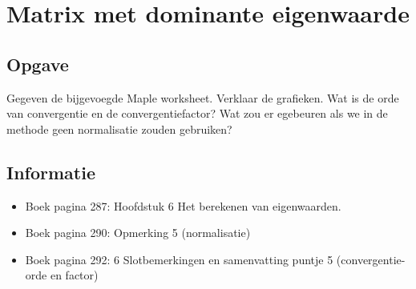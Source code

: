 \documentclass[examenvragen.tex]{subfiles}
\begin{document}
\section{Matrix met dominante eigenwaarde}
\subsection{Opgave}
Gegeven de bijgevoegde Maple worksheet. Verklaar de grafieken. Wat is de orde van convergentie en de convergentiefactor? Wat zou er egebeuren als we in de methode geen normalisatie zouden gebruiken?

\subsection{Informatie}
\begin{itemize}
\item Boek pagina 287: Hoofdstuk 6 Het berekenen van eigenwaarden.
\item Boek pagina 290: Opmerking 5 (normalisatie)
\item Boek pagina 292: 6 Slotbemerkingen en samenvatting puntje 5 (convergentie- orde en factor)
\end{itemize}
\end{document}
